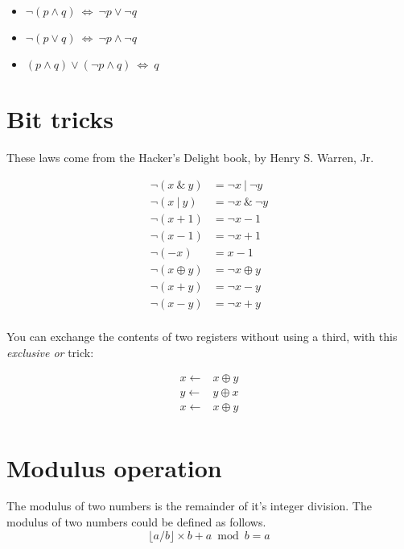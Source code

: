 \documentclass{article}
\begin{document}
\begin{itemize}
  \item $\neg (p \land q) \ \iff \ \neg p \lor \neg q$
  \item $\neg (p \lor q) \ \iff \ \neg p \land \neg q$
  \item $(p \land q) \lor (\neg p \land q) \ \iff \ q$
\end{itemize}

\section{Bit tricks}

These laws come from the Hacker's Delight book, by Henry S. Warren, Jr.

\begin{align*}
  \neg (x\ \&\ y)   &= \neg x\ |\ \neg y \\
  \neg (x\ |\ y)    &= \neg x\ \&\ \neg y \\
  \neg (x + 1)      &= \neg x - 1 \\
  \neg (x - 1)      &= \neg x + 1 \\
  \neg (-x)         &= x - 1 \\
  \neg (x \oplus y) &= \neg x \oplus y \\
  \neg (x + y)      &= \neg x - y \\
  \neg (x - y)      &= \neg x + y \\
\end{align*}

You can exchange the contents of two registers without using a third, with this
\emph{exclusive or} trick:

\begin{align*}
  x \gets& x \oplus y \\
  y \gets& y \oplus x \\
  x \gets& x \oplus y \\
\end{align*}

\section{Modulus operation}

The modulus of two numbers is the remainder of it's integer division. The
modulus of two numbers could be defined as follows.
\begin{equation*}
  \lfloor a / b \rfloor \times b + a \bmod b = a
\end{equation*}
\end{document}

